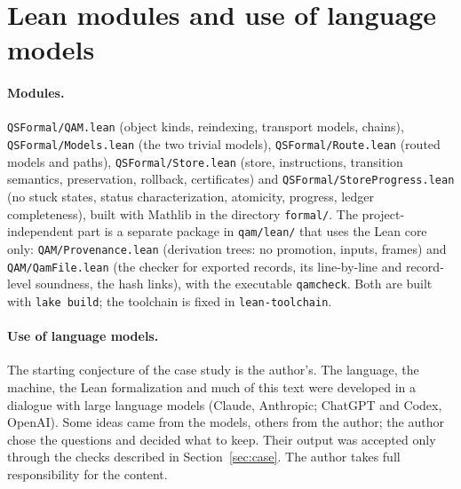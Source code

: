 \section{Lean modules and use of language models}\label{app:build}

\paragraph{Modules.}  \texttt{QSFormal/QAM.lean} (object kinds, reindexing, transport models, chains), \texttt{QSFormal/Models.lean} (the two
trivial models), \texttt{QSFormal/Route.lean} (routed models and paths), \texttt{QSFormal/Store.lean} (store, instructions, transition
semantics, preservation, rollback, certificates) and \texttt{QSFormal/StoreProgress.lean} (no stuck states, status characterization, atomicity,
progress, ledger completeness), built with Mathlib in the directory \texttt{formal/}.  The project-independent part is a separate
package in \texttt{qam/lean/} that uses the Lean core only: \texttt{QAM/Provenance.lean} (derivation trees: no promotion, inputs, frames)
and \texttt{QAM/QamFile.lean} (the checker for exported records, its line-by-line and record-level soundness, the hash links), with the
executable \texttt{qamcheck}.  Both are built with \texttt{lake build}; the toolchain is fixed in \texttt{lean-toolchain}.

\paragraph{Use of language models.}  The starting conjecture of the case study is the author's.  The language, the machine, the Lean
formalization and much of this text were developed in a dialogue with large language models (Claude, Anthropic; ChatGPT and Codex, OpenAI).
Some ideas came from the models, others from the author; the author chose the questions and decided what to keep.  Their output was accepted
only through the checks described in Section~\ref{sec:case}.  The author takes full responsibility for the content.
